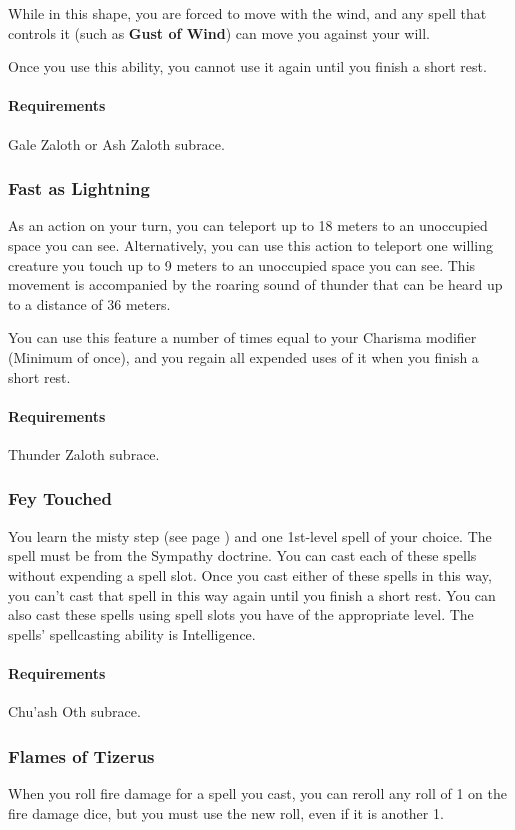     While in this shape, you are forced to move with the wind, and any spell that controls it (such as \textbf{Gust of Wind}) can move you against your will.

    Once you use this ability, you cannot use it again until you finish a short rest.
    \paragraph{Requirements} Gale Zaloth or Ash Zaloth subrace.
\subsubsection{Fast as Lightning} \label{feat::fastaslightning}
    As an action on your turn, you can teleport up to 18 meters to an unoccupied space you can see.
    Alternatively, you can use this action to teleport one willing creature you touch up to 9 meters to an unoccupied space you can see.
    This movement is accompanied by the roaring sound of thunder that can be heard up to a distance of 36 meters.

    You can use this feature a number of times equal to your Charisma modifier (Minimum of once), and you regain all expended uses of it when you finish a short rest.
    \paragraph{Requirements} Thunder Zaloth subrace.
\subsubsection{Fey Touched} \label{feat::feytouched}
    You learn the misty step (see page \pageref{spell::mistystep}) and one 1st-level spell of your choice.
    The spell must be from the Sympathy doctrine.
    You can cast each of these spells without expending a spell slot.
    Once you cast either of these spells in this way, you can't cast that spell in this way again until you finish a short rest.
    You can also cast these spells using spell slots you have of the appropriate level.
    The spells' spellcasting ability is Intelligence.
    \paragraph{Requirements} Chu'ash Oth subrace.
\subsubsection{Flames of Tizerus} \label{feat::flamesoftizerus}
    When you roll fire damage for a spell you cast, you can reroll any roll of 1 on the fire damage dice, but you must use the new roll, even if it is another 1.

